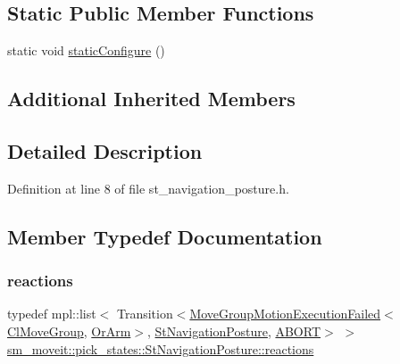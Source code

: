 \subsection*{Static Public Member Functions}
\begin{DoxyCompactItemize}
\item 
static void \hyperlink{structsm__moveit_1_1pick__states_1_1StNavigationPosture_a6d87dbbde4965e2f4c8606402c523a3d}{static\+Configure} ()
\end{DoxyCompactItemize}
\subsection*{Additional Inherited Members}


\subsection{Detailed Description}


Definition at line 8 of file st\+\_\+navigation\+\_\+posture.\+h.



\subsection{Member Typedef Documentation}
\mbox{\label{structsm__moveit_1_1pick__states_1_1StNavigationPosture_a4a54be576d30bc2cb4055730f0fad0c6}} 
\subsubsection{\texorpdfstring{reactions}{reactions}}
{\footnotesize\ttfamily typedef mpl\+::list$<$ Transition$<$\hyperlink{structmoveit__z__client_1_1MoveGroupMotionExecutionFailed}{Move\+Group\+Motion\+Execution\+Failed}$<$\hyperlink{classmoveit__z__client_1_1ClMoveGroup}{Cl\+Move\+Group}, \hyperlink{classsm__moveit_1_1OrArm}{Or\+Arm}$>$, \hyperlink{structsm__moveit_1_1pick__states_1_1StNavigationPosture}{St\+Navigation\+Posture}, \hyperlink{classABORT}{A\+B\+O\+RT}$>$ $>$ \hyperlink{structsm__moveit_1_1pick__states_1_1StNavigationPosture_a4a54be576d30bc2cb4055730f0fad0c6}{sm\+\_\+moveit\+::pick\+\_\+states\+::\+St\+Navigation\+Posture\+::reactions}}



